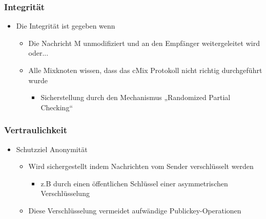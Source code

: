 \documentclass[t, xcolor=dvipsnames]{beamer}
\begin{document}
\begin{frame}
	\frametitle{Integrität}
	\begin{itemize}
		\item Die Integrität ist gegeben wenn
			\begin{itemize}
				\item Die Nachricht M unmodifiziert und an den Empfänger weitergeleitet wird oder...
				\item Alle Mixknoten wissen, dass das cMix Protokoll nicht richtig durchgeführt wurde
					\begin{itemize}
						\item Sicherstellung durch den Mechanismus „Randomized Partial Checking“
					\end{itemize}
			\end{itemize}
	\end{itemize}
	\vspace{\fill}
\end{frame}

\begin{frame}
	\frametitle{Vertraulichkeit}
	\begin{itemize}
		\item Schutzziel Anonymität
			\begin{itemize}
				\item Wird sichergestellt indem Nachrichten vom Sender verschlüsselt werden
					\begin{itemize}
						\item z.B durch einen öffentlichen Schlüssel einer asymmetrischen Verschlüsselung
					\end{itemize}
				\item Diese Verschlüsselung vermeidet aufwändige Publickey-Operationen 
			\end{itemize}
	\end{itemize}
	\vspace{\fill}
\end{frame}
\end{document}
